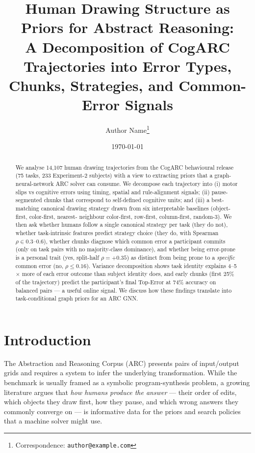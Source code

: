 \documentclass[11pt]{article}
\title{\vspace{-2em}Human Drawing Structure as Priors for Abstract Reasoning:\\
A Decomposition of CogARC Trajectories into Error Types, Chunks,
Strategies, and Common-Error Signals}
\author[1]{Author Name\thanks{Correspondence: \texttt{author@example.com}}}
\affil[1]{Affiliation}
\date{\today}
\begin{document}
\maketitle

\begin{abstract}
We analyse 14{,}107 human drawing trajectories from the CogARC
behavioural release (75 tasks, 233 Experiment-2 subjects) with a view
to extracting priors that a graph-neural-network ARC solver can
consume. We decompose each trajectory into (i) motor slips vs
cognitive errors using timing, spatial and rule-alignment signals;
(ii) pause-segmented chunks that correspond to self-defined cognitive
units; and (iii) a best-matching canonical drawing strategy drawn
from six interpretable baselines (object-first, color-first, nearest-
neighbour color-first, row-first, column-first, random-3). We then
ask whether humans follow a single canonical strategy per task
(they do not), whether task-intrinsic features predict strategy
choice (they do, with Spearman $\rho \in 0.3\text{--}0.6$), whether
chunks diagnose which common error a participant commits (only on
task pairs with no majority-class dominance), and whether being
error-prone is a personal trait (yes, split-half $\rho = +0.35$)
as distinct from being prone to a \emph{specific} common error
(no, $\rho \leq 0.16$). Variance decomposition shows task identity
explains 4--5$\times$ more of each error outcome than subject
identity does, and early chunks (first 25\% of the trajectory)
predict the participant's final Top-Error at 74\% accuracy on
balanced pairs --- a useful online signal. We discuss how these
findings translate into task-conditional graph priors for an ARC
GNN.
\end{abstract}


\section{Introduction}
\label{sec:intro}

The Abstraction and Reasoning Corpus (ARC) \cite{chollet2019measure}
presents pairs of input/output grids and requires a system to infer
the underlying transformation. While the benchmark is usually framed
as a symbolic program-synthesis problem, a growing literature argues
that \emph{how humans produce the answer} --- their order of edits,
which objects they draw first, how they pause, and which wrong
answers they commonly converge on --- is informative data for the
priors and search policies that a machine solver might use.
\end{document}
